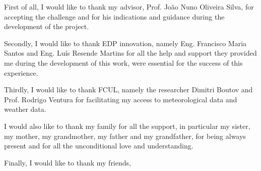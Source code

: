 
First of all, I would like to thank my advisor, Prof. João Nuno Oliveira Silva, for accepting the challenge and for his indications and guidance during the development of the project. 

Secondly, I would like to thank EDP innovation, namely Eng. Francisco Maria Santos and Eng. Luís Resende Martins for all the help and support they provided me during the development of this work, were essential for the success of this experience.

Thirdly, I would like to thank FCUL, namely the researcher Dimitri Boutov and Prof. Rodrigo Ventura for facilitating my access to meteorological data and weather data.

I would also like to thank my family for all the support, in particular my sister, my mother, my grandmother, my father and my grandfather, for being always present and for all the unconditional love and understanding.

Finally, I would like to thank my friends, 